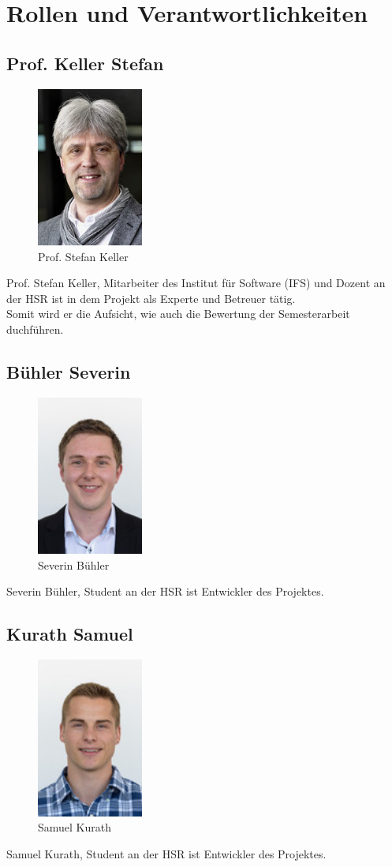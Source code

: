 \section{Rollen und Verantwortlichkeiten}
\subsection{Prof. Keller Stefan}
\begin{figure}[H]
	\centering
	\includegraphics[width=35mm]{images/Skeller.jpg}
	\caption{Prof. Stefan Keller}
\end{figure}

Prof. Stefan Keller, Mitarbeiter des Institut für Software (IFS) und Dozent an
der HSR ist in dem Projekt als Experte und Betreuer tätig. \\
Somit wird er die Aufsicht, wie auch die Bewertung der Semesterarbeit duchführen.

\subsection{Bühler Severin}
\begin{figure}[H]
	\centering
	\includegraphics[width=35mm]{images/sbuehler.jpg}
	\caption{Severin Bühler}
\end{figure}
Severin Bühler, Student an der HSR ist Entwickler des Projektes.

\subsection{Kurath Samuel}
\begin{figure}[H]
	\centering
	\includegraphics[width=35mm]{images/skurath.jpg}
	\caption{Samuel Kurath}
\end{figure}
Samuel Kurath, Student an der HSR ist Entwickler des Projektes.
